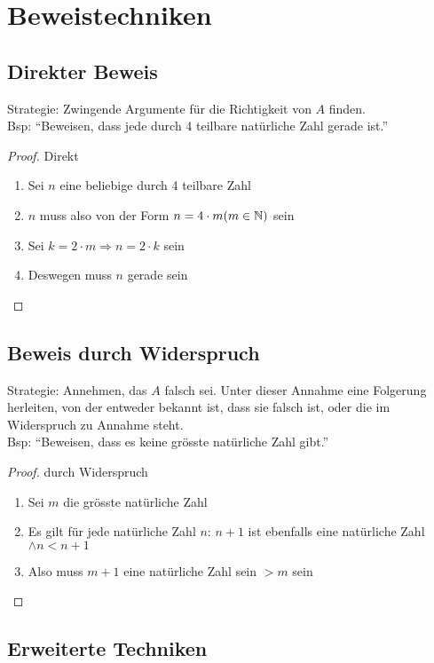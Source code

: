 \section{Beweistechniken}
\subsection{Direkter Beweis}
Strategie: Zwingende Argumente für die Richtigkeit von $A$ finden.\\
Bsp: \enquote{Beweisen, dass jede durch 4 teilbare natürliche Zahl gerade ist.}
\begin{proof}
Direkt
\begin{enumerate}\itemsep0em
	\item Sei $n$ eine beliebige durch 4 teilbare Zahl
	\item $n$ muss also von der Form $n = 4 \cdot m (m \in \mathbb{N})$ sein
	\item Sei $k = 2 \cdot m \Rightarrow n = 2 \cdot k$ sein
	\item Deswegen muss $n$ gerade sein \qedhere
\end{enumerate}
\end{proof}


\subsection{Beweis durch Widerspruch}
Strategie: Annehmen, das $A$ falsch sei. Unter dieser Annahme eine Folgerung
herleiten, von der entweder bekannt ist, dass sie falsch ist, oder die im
Widerspruch zu Annahme steht.\\
Bsp: \enquote{Beweisen, dass es keine grösste natürliche Zahl gibt.}

\begin{proof}
\renewcommand{\qedsymbol}{\lightning}
durch Widerspruch
	\begin{enumerate}\itemsep0em
		\item Sei $m$ die grösste natürliche Zahl
		\item Es gilt für jede natürliche Zahl $n$: $n + 1$ ist ebenfalls eine natürliche Zahl $\wedge n < n + 1$
		\item Also muss $m + 1$ eine natürliche Zahl sein $> m$ sein \qedhere
	\end{enumerate}
\end{proof}

\subsection{Erweiterte Techniken}

